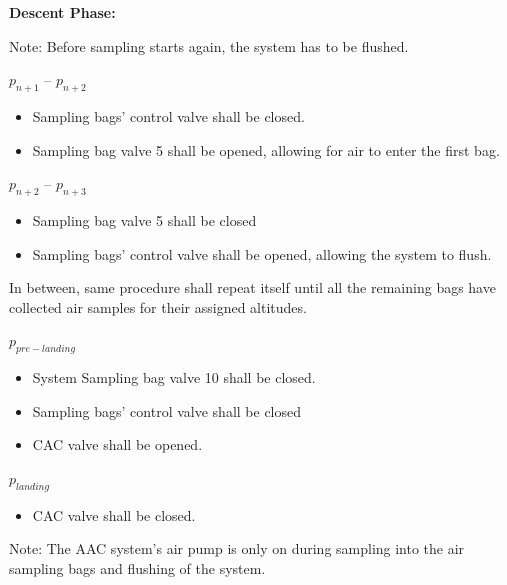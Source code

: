 \textbf{Descent Phase:}

Note: Before sampling starts again, the system has to be flushed. 

$p_{n+1}$ – $p_{n+2}$
\begin{itemize}
    \item Sampling bags' control valve shall be closed.
    \item Sampling bag valve 5 shall be opened, allowing for air to enter the first bag.
\end{itemize}

$p_{n+2}$ – $p_{n+3}$
\begin{itemize}
    \item Sampling bag valve 5 shall be closed
    \item Sampling bags' control valve shall be opened, allowing the system to flush. 
\end{itemize}

In between, same procedure shall repeat itself until all the remaining bags have collected air samples for their assigned altitudes.

$p_{pre-landing}$ 
\begin{itemize}
    \item System Sampling bag valve 10 shall be closed.
    \item Sampling bags' control valve shall be closed
    \item CAC valve shall be opened.
\end{itemize}


$p_{landing}$
\begin{itemize}
    \item CAC valve shall be closed.
\end{itemize}


Note: The AAC system's air pump is only on during sampling into the air sampling bags and flushing of the system.


\raggedbottom